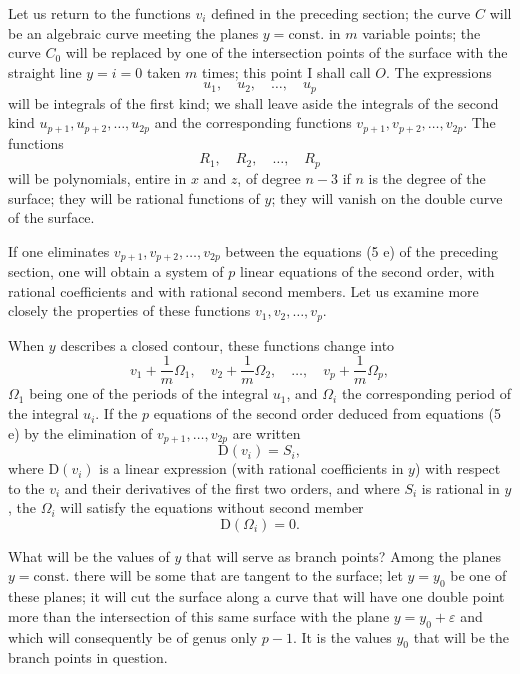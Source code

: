 \documentclass{article}
\begin{document}
Let us return to the functions $v_{i}$ defined in the preceding section; the curve $C$ will be an algebraic curve meeting the planes $y = \text{const.}$ in $m$ variable points; the curve $C_{0}$ will be replaced by one of the intersection points of the surface with the straight line $y = i = 0$ taken $m$ times; this point I shall call $O$. The expressions
\[
u_{1}, \quad u_{2}, \quad \ldots, \quad u_{p}
\]
will be integrals of the first kind; we shall leave aside the integrals of the second kind $u_{p+1}, u_{p+2}, \ldots, u_{2p}$ and the corresponding functions $v_{p+1}, v_{p+2}, \ldots, v_{2p}$. The functions
\[
R_{1}, \quad R_{2}, \quad \ldots, \quad R_{p}
\]
will be polynomials, entire in $x$ and $z$, of degree $n - 3$ if $n$ is the degree of the surface; they will be rational functions of $y$; they will vanish on the double curve of the surface.

If one eliminates $v_{p+1}, v_{p+2}, \ldots, v_{2p}$ between the equations (5 e) of the preceding section, one will obtain a system of $p$ linear equations of the second order, with rational coefficients and with rational second members. Let us examine more closely the properties of these functions $v_{1}, v_{2}, \ldots, v_{p}$.

When $y$ describes a closed contour, these functions change into
\[
v_{1} + \frac{1}{m} \Omega_{1}, \quad v_{2} + \frac{1}{m} \Omega_{2}, \quad \ldots, \quad v_{p} + \frac{1}{m} \Omega_{p},
\]
$\Omega_{1}$ being one of the periods of the integral $u_{1}$, and $\Omega_{i}$ the corresponding period of the integral $u_{i}$. If the $p$ equations of the second order deduced from equations (5 e) by the elimination of $v_{p+1}, \ldots, v_{2p}$ are written
\[
\mathrm{D}(v_{i}) = S_{i}, \tag{1}
\]
where $\mathrm{D}(v_{i})$ is a linear expression (with rational coefficients in $y$) with respect to the $v_{i}$ and their derivatives of the first two orders, and where $S_{i}$ is rational in $y$, the $\Omega_{i}$ will satisfy the equations without second member
\[
\mathrm{D}(\Omega_{i}) = 0. \tag{2}
\]

What will be the values of $y$ that will serve as branch points? Among the planes $y = \text{const.}$ there will be some that are tangent to the surface; let $y = y_{0}$ be one of these planes; it will cut the surface along a curve that will have one double point more than the intersection of this same surface with the plane $y = y_{0} + \varepsilon$ and which will consequently be of genus only $p - 1$. It is the values $y_{0}$ that will be the branch points in question.
\end{document}
